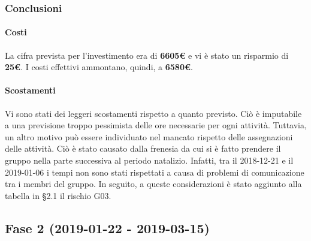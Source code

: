 	\subsubsection{Conclusioni}
		\paragraph{Costi\\}
			La cifra prevista per l'investimento era di \textbf{6605€} e vi è stato un risparmio di \textbf{25€}. I costi effettivi ammontano, quindi, a \textbf{6580€}. 
		\paragraph{Scostamenti\\}
			Vi sono stati dei leggeri scostamenti rispetto a quanto previsto. Ciò è imputabile a una previsione troppo pessimista delle ore necessarie per ogni attività. Tuttavia, un altro motivo può essere individuato nel mancato rispetto delle assegnazioni delle attività. Ciò è stato causato dalla frenesia da cui si è fatto prendere il gruppo nella parte successiva al periodo natalizio. Infatti, tra il 2018-12-21 e il 2019-01-06 i tempi non sono stati rispettati a causa di problemi di comunicazione tra i membri del gruppo. In seguito, a queste considerazioni è stato aggiunto alla tabella in §2.1 il rischio G03.
			
\subsection{Fase 2 (2019-01-22 - 2019-03-15)}
